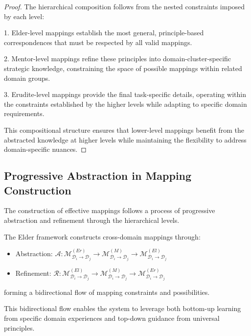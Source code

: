 \begin{proof}
The hierarchical composition follows from the nested constraints imposed by each level:

1. Elder-level mappings establish the most general, principle-based correspondences that must be respected by all valid mappings.

2. Mentor-level mappings refine these principles into domain-cluster-specific strategic knowledge, constraining the space of possible mappings within related domain groups.

3. Erudite-level mappings provide the final task-specific details, operating within the constraints established by the higher levels while adapting to specific domain requirements.

This compositional structure ensures that lower-level mappings benefit from the abstracted knowledge at higher levels while maintaining the flexibility to address domain-specific nuances.
\end{proof}

\subsection{Progressive Abstraction in Mapping Construction}

The construction of effective mappings follows a process of progressive abstraction and refinement through the hierarchical levels.

\begin{definition}
The Elder framework constructs cross-domain mappings through:
\begin{itemize}
    \item Abstraction: $\mathcal{A}: \mathcal{M}^{(Er)}_{\mathcal{D}_i \rightarrow \mathcal{D}_j} \rightarrow \mathcal{M}^{(M)}_{\mathcal{D}_i \rightarrow \mathcal{D}_j} \rightarrow \mathcal{M}^{(El)}_{\mathcal{D}_i \rightarrow \mathcal{D}_j}$
    \item Refinement: $\mathcal{R}: \mathcal{M}^{(El)}_{\mathcal{D}_i \rightarrow \mathcal{D}_j} \rightarrow \mathcal{M}^{(M)}_{\mathcal{D}_i \rightarrow \mathcal{D}_j} \rightarrow \mathcal{M}^{(Er)}_{\mathcal{D}_i \rightarrow \mathcal{D}_j}$
\end{itemize}
forming a bidirectional flow of mapping constraints and possibilities.
\end{definition}

This bidirectional flow enables the system to leverage both bottom-up learning from specific domain experiences and top-down guidance from universal principles.

